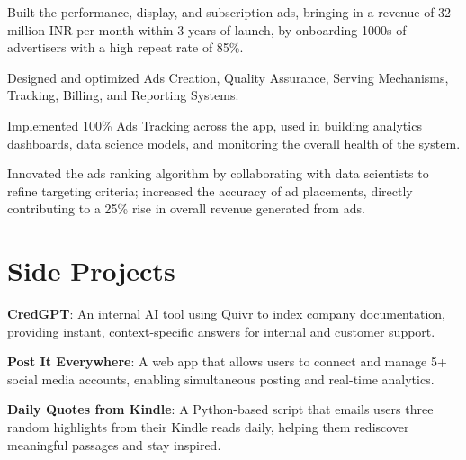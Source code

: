 \documentclass[]{sachin-resume-openfont}
\begin{document}
\begin{minipage}[t]{0.69\textwidth}
\vspace{\topsep}
\begin{tightemize}
\item Built the performance, display, and subscription ads, bringing in a revenue of 32 million INR per month within 3 years of launch, by onboarding 1000s of advertisers with a high repeat rate of 85\%.
\item Designed and optimized Ads Creation, Quality Assurance, Serving Mechanisms, Tracking, Billing, and Reporting Systems.
\item Implemented 100\% Ads Tracking across the app, used in building analytics dashboards, data science models, and monitoring the overall health of the system.
\item Innovated the ads ranking algorithm by collaborating with data scientists to refine targeting criteria; increased the accuracy of ad placements, directly contributing to a 25\% rise in overall revenue generated from ads.
\end{tightemize}
\sectionsep


\section{Side Projects}
\vspace{\topsep}
\begin{tightemize}
\item \textbf{CredGPT}: An internal AI tool using Quivr to index company documentation, providing instant, context-specific answers for internal and customer support.
\item \textbf{Post It Everywhere}: A web app that allows users to connect and manage 5+ social media accounts, enabling simultaneous posting and real-time analytics.
\item \textbf{Daily Quotes from Kindle}: A Python-based script that emails users three random highlights from their Kindle reads daily, helping them rediscover meaningful passages and stay inspired.
\end{tightemize}
\sectionsep




\end{minipage}
\end{document}

